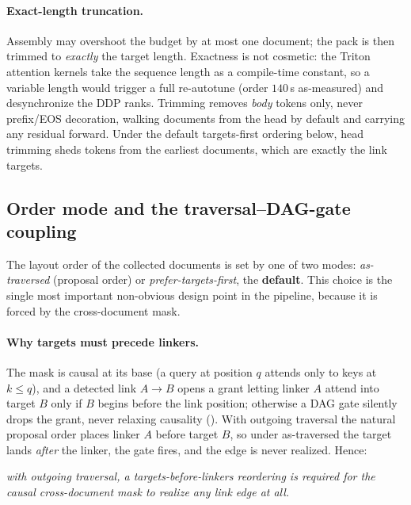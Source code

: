 \paragraph{Exact-length truncation.}
Assembly may overshoot the budget by at most one document; the pack is then trimmed to
\emph{exactly} the target length. Exactness is not cosmetic: the Triton attention
kernels take the sequence length as a compile-time constant, so a variable length would
trigger a full re-autotune (order $140$\,s as-measured) and desynchronize the DDP ranks.
Trimming removes \emph{body} tokens only, never prefix/EOS decoration, walking documents
from the head by default and carrying any residual forward. Under the default
targets-first ordering below, head trimming sheds tokens from the earliest documents,
which are exactly the link targets.

\subsection{Order mode and the traversal--DAG-gate coupling}
\label{app:traversal:order}

The layout order of the collected documents is set by one of two modes:
\emph{as-traversed} (proposal order) or \emph{prefer-targets-first}, the
\textbf{default}. This choice is the single most important non-obvious design point in
the pipeline, because it is forced by the cross-document mask.

\paragraph{Why targets must precede linkers.}
The mask is causal at its base (a query at position $q$ attends only to keys at
$k\le q$), and a detected link $A\!\to\!B$ opens a grant letting linker $A$ attend into
target $B$ only if $B$ begins before the link position; otherwise a DAG gate silently
drops the grant, never relaxing causality (). With outgoing traversal
the natural proposal order places linker $A$ before target $B$, so under as-traversed the
target lands \emph{after} the linker, the gate fires, and the edge is never realized.
Hence:
\begin{center}
\emph{with outgoing traversal, a targets-before-linkers reordering is required for the
causal cross-document mask to realize any link edge at all.}
\end{center}

